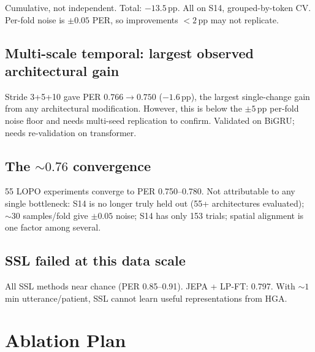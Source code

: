 \documentclass[11pt,letterpaper]{article}
\newcommand{\pp}{\,\text{pp}}
\begin{document}
Cumulative, not independent. Total: $-13.5\pp$. All on S14, grouped-by-token CV. Per-fold noise is $\pm 0.05$ PER, so improvements $< 2\pp$ may not replicate.

\subsection{Multi-scale temporal: largest observed architectural gain}

Stride 3+5+10 gave PER $0.766 \to 0.750$ ($-1.6\pp$), the largest single-change gain from any architectural modification. However, this is below the $\pm 5\pp$ per-fold noise floor and needs multi-seed replication to confirm. Validated on BiGRU; needs re-validation on transformer.

\subsection{The ${\sim}0.76$ convergence}

55 LOPO experiments converge to PER 0.750--0.780. Not attributable to any single bottleneck: S14 is no longer truly held out (55+ architectures evaluated); ${\sim}30$ samples/fold give $\pm 0.05$ noise; S14 has only 153 trials; spatial alignment is one factor among several.

\subsection{SSL failed at this data scale}

All SSL methods near chance (PER 0.85--0.91). JEPA + LP-FT: 0.797. With ${\sim}1$\,min utterance/patient, SSL cannot learn useful representations from HGA.



\section{Ablation Plan}\label{sec:ablations}
\end{document}
